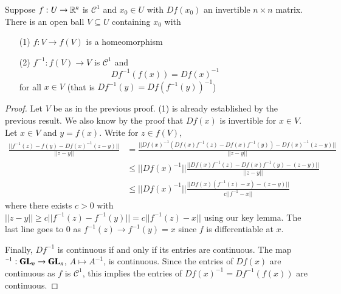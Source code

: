\begin{namthm}
    Suppose $f:U\rightarrow \mathbb R^n$ is $\mathcal{C}^1$ and $x_0 \in U$ with $Df(x_0)$ an invertible $n\times n$ matrix. There is an open ball $V \subseteq U$ containing $x_0$ with \begin{itemize}
        \item[(1)] $f:V\rightarrow f(V)$ is a homeomorphism
        \item[(2)] $f^{-1}:f(V)\rightarrow V$ is $\mathcal{C}^1$ and $$Df^{-1}(f(x)) = Df(x)^{-1}$$ for all $x \in V$ (that is $Df^{-1}(y) = Df(f^{-1}(y))^{-1}$)
    \end{itemize}
\end{namthm}
\begin{proof}
    Let $V$ be as in the previous proof. (1) is already established by the previous result. We also know by the proof that $Df(x)$ is invertible for $x \in V$. Let $x \in V$ and $y = f(x)$. Write for $z \in f(V)$, \begin{align*}
        \frac{||f^{-1}(z) - f(y) - Df(x)^{-1}(z-y)||}{||z-y||} &= \frac{||Df(x)^{-1}(Df(x)f^{-1}(z) - Df(x)f^{-1}(y)) - Df(x)^{-1}(z-y)||}{||z-y||} \\
        &\leq ||Df(x)^{-1}||\frac{||Df(x)f^{-1}(z) - Df(x)f^{-1}(y) - (z-y)||}{||z-y||} \\
        &\leq  ||Df(x)^{-1}||\frac{||Df(x)(f^{-1}(z) - x) - (z-y)||}{c||f^{-1}-x||}
    \end{align*}
    where there exists $c > 0$ with $||z-y|| \geq c||f^{-1}(z) - f^{-1}(y)|| = c||f^{-1}(z) - x||$ using our key lemma. The last line goes to $0$ as $f^{-1}(z)\rightarrow f^{-1}(y) = x$ since $f$ is differentiable at $x$. 

    Finally, $Df^{-1}$ is continuous if and only if its entries are continuous. The map $^{-1}:\mathbf{GL}_n\rightarrow \mathbf{GL}_n$, $A\mapsto A^{-1}$, is continuous. Since the entries of $Df(x)$ are continuous as $f$ is $\mathcal{C}^1$, this implies the entries of $Df(x)^{-1} = Df^{-1}(f(x))$ are continuous.
\end{proof}



